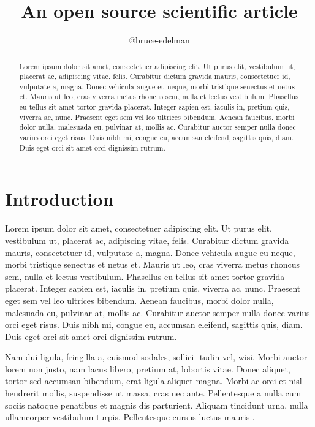 \documentclass[twocolumn]{aastex631}
\begin{document}
\title{An open source scientific article}

\author{@bruce-edelman}

\begin{abstract}
    Lorem ipsum dolor sit amet, consectetuer adipiscing elit. 
    Ut purus elit, vestibulum ut, placerat ac, adipiscing vitae, felis. 
    Curabitur dictum gravida mauris, consectetuer id, vulputate a, magna. 
    Donec vehicula augue eu neque, morbi tristique senectus et netus et. 
    Mauris ut leo, cras viverra metus rhoncus sem, nulla et lectus vestibulum. 
    Phasellus eu tellus sit amet tortor gravida placerat. 
    Integer sapien est, iaculis in, pretium quis, viverra ac, nunc. 
    Praesent eget sem vel leo ultrices bibendum. 
    Aenean faucibus, morbi dolor nulla, malesuada eu, pulvinar at, mollis ac. 
    Curabitur auctor semper nulla donec varius orci eget risus. 
    Duis nibh mi, congue eu, accumsan eleifend, sagittis quis, diam. 
    Duis eget orci sit amet orci dignissim rutrum.
\end{abstract}

\section{Introduction}
\label{sec:intro}

Lorem ipsum dolor sit amet, consectetuer adipiscing elit. 
Ut purus elit, vestibulum ut, placerat ac, adipiscing vitae, felis. 
Curabitur dictum gravida mauris, consectetuer id, vulputate a, magna. 
Donec vehicula augue eu neque, morbi tristique senectus et netus et. 
Mauris ut leo, cras viverra metus rhoncus sem, nulla et lectus vestibulum. 
Phasellus eu tellus sit amet tortor gravida placerat. 
Integer sapien est, iaculis in, pretium quis, viverra ac, nunc. 
Praesent eget sem vel leo ultrices bibendum. 
Aenean faucibus, morbi dolor nulla, malesuada eu, pulvinar at, mollis ac. 
Curabitur auctor semper nulla donec varius orci eget risus. 
Duis nibh mi, congue eu, accumsan eleifend, sagittis quis, diam. 
Duis eget orci sit amet orci dignissim rutrum.

Nam dui ligula, fringilla a, euismod sodales, sollici- tudin vel, wisi. 
Morbi auctor lorem non justo, nam lacus libero, pretium at, lobortis vitae. 
Donec aliquet, tortor sed accumsan bibendum, erat ligula aliquet magna. 
Morbi ac orci et nisl hendrerit mollis, suspendisse ut massa, cras nec ante. 
Pellentesque a nulla cum sociis natoque penatibus et magnis dis parturient. 
Aliquam tincidunt urna, nulla ullamcorper vestibulum turpis. 
Pellentesque cursus luctus mauris \citep{Luger2021}.


\end{document}
